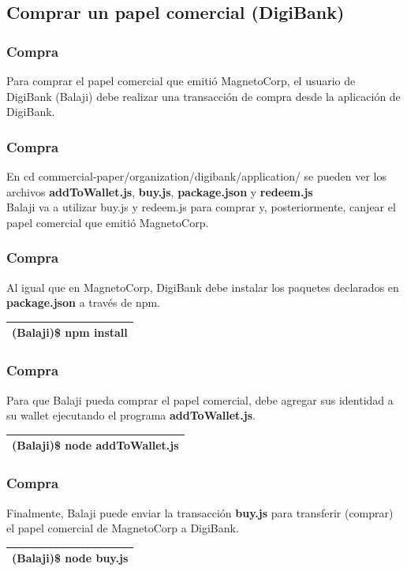 \documentclass{beamer}
\begin{document}
	\subsection{Comprar un papel comercial (DigiBank)}
	
	\begin{frame}
		\frametitle{Compra}
		Para comprar el papel comercial que emitió MagnetoCorp, el usuario de DigiBank (Balaji) debe realizar una transacción de compra desde la aplicación de DigiBank.
	\end{frame}
	
	\begin{frame}
		\frametitle{Compra}
		En cd commercial-paper/organization/digibank/application/ se pueden ver los archivos \textbf{addToWallet.js}, \textbf{buy.js}, \textbf{package.json} y \textbf{redeem.js}\\
		\vspace{4mm}
		Balaji va a utilizar buy.js y redeem.js para comprar y, posteriormente, canjear el papel comercial que emitió MagnetoCorp.
	\end{frame}
	
	\begin{frame}
		\frametitle{Compra}
		Al igual que en MagnetoCorp, DigiBank debe instalar los paquetes declarados en \textbf{package.json} a través de npm.\\
		\begin{center}
			\begin{tabulary}{\linewidth}{L}
				\hline
				(Balaji)\$ npm install \\
				\hline
			\end{tabulary} 
		\end{center}
	\end{frame}
	
	\begin{frame}
		\frametitle{Compra}
		Para que Balaji pueda comprar el papel comercial, debe agregar sus identidad a su wallet ejecutando el programa \textbf{addToWallet.js}.\\
		\begin{center}
			\begin{tabulary}{\linewidth}{L}
				\hline
				(Balaji)\$ node addToWallet.js \\
				\hline
			\end{tabulary} 
		\end{center}
	\end{frame}
	
	\begin{frame}
		\frametitle{Compra}
		Finalmente, Balaji puede enviar la transacción \textbf{buy.js} para transferir (comprar) el papel comercial de MagnetoCorp a DigiBank.\\
		\begin{center}
			\begin{tabulary}{\linewidth}{L}
				\hline
				(Balaji)\$ node buy.js \\
				\hline
			\end{tabulary} 
		\end{center}
	\end{frame}
	
\end{document}

